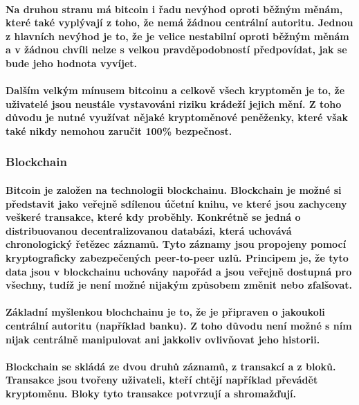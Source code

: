 \documentclass[thesis=B,czech]{FITthesis}[2019/03/21]
\begin{document}
\paragraph{
Na druhou stranu má bitcoin i řadu nevýhod oproti běžným měnám, které také vyplývají z toho, že nemá žádnou centrální autoritu. Jednou z hlavních nevýhod je to, že je velice nestabilní oproti běžným měnám a v žádnou chvíli nelze s velkou pravděpodobností předpovídat, jak se bude jeho hodnota vyvíjet. 
}
\paragraph{
Dalším velkým mínusem bitcoinu a celkově všech kryptoměn je to, že uživatelé jsou neustále vystavováni riziku krádeží jejich mění. Z toho důvodu je nutné využívat nějaké kryptoměnové peněženky, které však také nikdy nemohou zaručit 100\% bezpečnost.\cite{Finex}
}
\subsubsection{Blockchain}
\paragraph{
Bitcoin je založen na technologii blockchainu. Blockchain je možné si představit jako veřejně sdílenou účetní knihu, ve které jsou zachyceny veškeré transakce, které kdy proběhly. Konkrétně se jedná o distribuovanou decentralizovanou databázi, která uchovává chronologický řetězec záznamů. Tyto záznamy jsou propojeny pomocí kryptograficky zabezpečených peer-to-peer uzlů. Principem je, že tyto data jsou v blockchainu uchovány napořád a jsou veřejně dostupná pro všechny, tudíž je není možné nijakým způsobem změnit nebo zfalšovat. \cite{Bitcoin_how_it_works}
}
\paragraph{
Základní myšlenkou blochchainu je to, že je připraven o jakoukoli centrální autoritu (například banku). Z toho důvodu není možné s ním nijak centrálně manipulovat ani jakkoliv ovlivňovat jeho historii.
}
\paragraph{
Blockchain se skládá ze dvou druhů záznamů, z transakcí a z bloků. Transakce jsou tvořeny uživateli, kteří chtějí například převádět kryptoměnu. Bloky tyto transakce potvrzují a shromažďují. \cite{Finex_blockchain}
}
\end{document}
